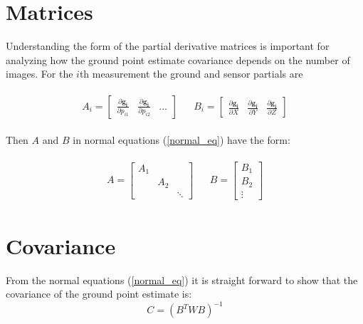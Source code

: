 \documentclass[]{article}
\begin{document}
\section*{Matrices}
Understanding the form of the partial derivative matrices is important for analyzing how the ground point estimate covariance depends on the number of images.  For the $i$th measurement the ground and sensor partials are

\begin{align}\label{ith_partials}
\begin{aligned}
A_{i} = 
\begin{bmatrix}
\frac{\partial{\pmb{g_i}}}{\partial{p_{i1}}} & \frac{\partial{\pmb{g_i}}}{\partial{p_{i2}}} & \ldots
\end{bmatrix}  
&& 
B_{i} =
\begin{bmatrix}
\frac{\partial{\pmb{g_i}}}{\partial{X}} & \frac{\partial{\pmb{g_i}}}{\partial{Y}} & \frac{\partial{\pmb{g_i}}}{\partial{Z}}
\end{bmatrix}
\end{aligned}
\end{align}

Then $A$ and $B$ in normal equations (\ref{normal_eq}) have the form:

\begin{align}\label{full_partials}
\begin{aligned}
A = 
\begin{bmatrix}
A_{1} &  & \\
& 	A_{2} \\
&   & \ddots
\end{bmatrix}
&& 
B = 
\begin{bmatrix}
B_{1}  \\
B_{2} \\
\vdots
\end{bmatrix}
\end{aligned}
\end{align}

\section*{Covariance}
From the normal equations (\ref{normal_eq}) it is straight forward to show that the covariance of the ground point estimate is:
\begin{equation} \label{covariance_eq}
C = (B^TWB)^{-1}
\end{equation}
\end{document}
